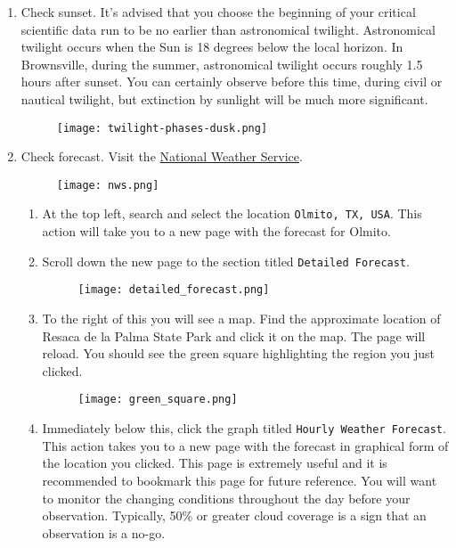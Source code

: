 \documentclass{article}
\begin{document}
			\begin{enumerate}

				\item Check sunset. It's advised that you choose the beginning of your critical scientific data run to be no earlier than astronomical twilight. Astronomical twilight occurs when the Sun is 18 degrees below the local horizon. In Brownsville, during the summer, astronomical twilight occurs roughly 1.5 hours after sunset. You can certainly observe before this time, during civil or nautical twilight, but extinction by sunlight will be much more significant.

				\begin{figure}[h]
					\centering
					\texttt{[image: twilight-phases-dusk.png]}
				\end{figure}

				\item Check forecast. Visit the \href{https://www.weather.gov}{National Weather Service}.

				\begin{figure}[h]
					\centering
					\texttt{[image: nws.png]}
				\end{figure}

				\begin{enumerate}

					\item At the top left, search and select the location \texttt{Olmito, TX, USA}. This action will take you to a new page with the forecast for Olmito.

					\item Scroll down the new page to the section titled \texttt{Detailed Forecast}.

					\begin{figure}[h]
						\centering
						\texttt{[image: detailed\_forecast.png]}
					\end{figure}

					\item To the right of this you will see a map. Find the approximate location of Resaca de la Palma State Park and click it on the map. The page will reload. You should see the green square highlighting the region you just clicked.

					\begin{figure}[h]
						\centering
						\texttt{[image: green\_square.png]}
					\end{figure}

					\item Immediately below this, click the graph titled \texttt{Hourly Weather Forecast}. This action takes you to a new page with the forecast in graphical form of the location you clicked. This page is extremely useful and it is recommended to bookmark this page for future reference. You will want to monitor the changing conditions throughout the day before your observation. Typically, 50\% or greater cloud coverage is a sign that an observation is a no-go.


\end{enumerate}
\end{enumerate}
\end{document}
